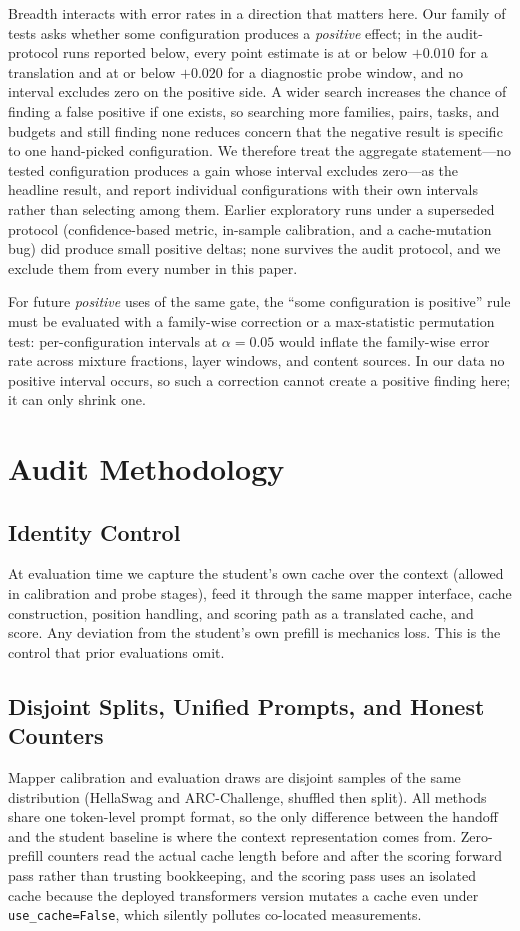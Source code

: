 \documentclass[10pt]{article}
\begin{document}
Breadth interacts with error rates in a direction that matters here. Our family
of tests asks whether some configuration produces a \emph{positive} effect; in
the audit-protocol runs reported below, every point estimate is at or below
$+0.010$ for a translation and at or below $+0.020$ for a diagnostic probe
window, and no interval excludes zero on the positive side. A wider search
increases the chance of finding a false positive if one exists, so searching
more families, pairs, tasks, and budgets and still finding none reduces concern that the negative result is specific to one hand-picked configuration. We therefore treat the aggregate statement---no
tested configuration produces a gain whose interval excludes zero---as the
headline result, and report individual configurations with their own intervals
rather than selecting among them. Earlier exploratory runs under a superseded
protocol (confidence-based metric, in-sample calibration, and a cache-mutation
bug) did produce small positive deltas; none survives the audit protocol, and
we exclude them from every number in this paper.

For future \emph{positive} uses of the same gate, the ``some configuration is
positive'' rule must be evaluated with a family-wise correction or a
max-statistic permutation test: per-configuration intervals at
$\alpha{=}0.05$ would inflate the family-wise error rate across mixture
fractions, layer windows, and content sources. In our data no positive interval
occurs, so such a correction cannot create a positive finding here; it can only
shrink one.

\section{Audit Methodology}
\label{sec:method}

\subsection{Identity Control}
At evaluation time we capture the student's own cache over the context
(allowed in calibration and probe stages), feed it through the same mapper
interface, cache construction, position handling, and scoring path as a
translated cache, and score. Any deviation from the student's own prefill is
mechanics loss. This is the control that prior evaluations omit.

\subsection{Disjoint Splits, Unified Prompts, and Honest Counters}
Mapper calibration and evaluation draws are disjoint samples of the same
distribution (HellaSwag and ARC-Challenge, shuffled then split). All methods
share one token-level prompt format, so the only difference between the
handoff and the student baseline is where the context representation comes
from. Zero-prefill counters read the actual cache length before and after the
scoring forward pass rather than trusting bookkeeping, and the scoring pass
uses an isolated cache because the deployed transformers version mutates a
cache even under \texttt{use\_cache=False}, which silently pollutes
co-located measurements.
\end{document}
